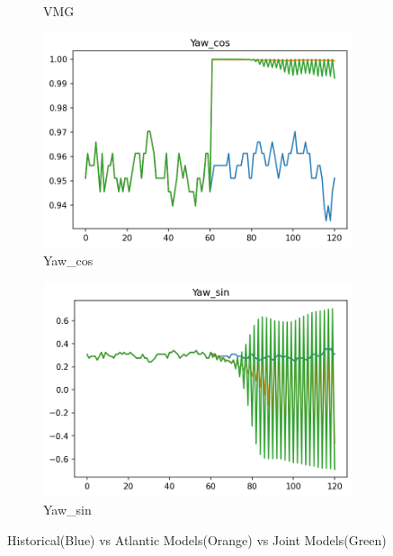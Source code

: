 \begin{figure}[ht]
\begin{subfigure}[b]{0.32\textwidth}
         \caption{VMG}
     \end{subfigure}
     \begin{subfigure}[b]{0.32\textwidth}
         \centering
         \includegraphics[width=\textwidth]{figures/prediction-plots-joint/Yaw_cos.png}
         \caption{Yaw\_cos}
     \end{subfigure}
     \begin{subfigure}[b]{0.32\textwidth}
         \centering
         \includegraphics[width=\textwidth]{figures/prediction-plots-joint/Yaw_sin.png}
         \caption{Yaw\_sin}
     \end{subfigure}
        \caption{Historical(Blue) vs Atlantic Models(Orange) vs Joint Models(Green)}
        \label{fig:prediction-full-2-joint}
\end{figure}


